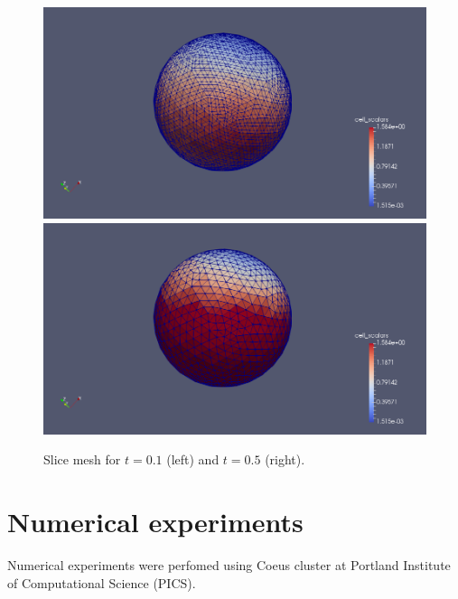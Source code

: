 \documentclass[12pt]{article}
\begin{document}
\begin{figure}[!htb]
%
  \includegraphics[width=\linewidth]{mesh_bothparts.png}
\endminipage\hfill
{}%
  \includegraphics[width=\linewidth]{mesh_bothparts_moment2.png}
\endminipage
\caption{Slice mesh for $t=0.1$ (left) and $t = 0.5$ (right).}
\end{figure}


\section{Numerical experiments}

Numerical experiments were perfomed using Coeus cluster \cite{coeus} at Portland Institute of Computational Science (PICS). %
\end{document}
